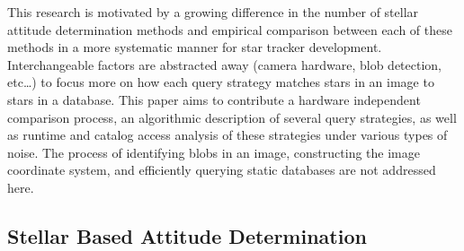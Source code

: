 This research is motivated by a growing difference in the number of stellar attitude determination methods and
empirical comparison between each of these methods in a more systematic manner for star tracker development.
Interchangeable factors are abstracted away (camera hardware, blob detection, etc\ldots) to focus more on how each
query strategy matches stars in an image to stars in a database.
This paper aims to contribute a hardware independent comparison process, an algorithmic description of several
query strategies, as well as runtime and catalog access analysis of these strategies under various types of noise.
The process of identifying blobs in an image, constructing the image coordinate system, and efficiently querying
static databases are not addressed here.

\subsection{Stellar Based Attitude Determination}\label{subsec:stellarBasedAttitudeDetermination}
%

